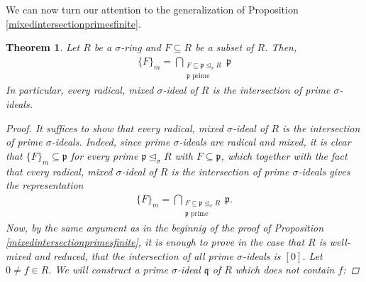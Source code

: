 \documentclass{article}
\def\p{\mathfrak{p}}
\def\q{\mathfrak{q}}
\def\s{\sigma}
\def\si{\unlhd_{\sigma}}
\newenvironment{bew}{\begin{proof}[Proof]}{\end{proof}}
\theoremstyle{plain}
\newtheorem{theorem}[Satz]{Theorem}
\theoremstyle{definition}
\begin{document}
We can now turn our attention to the generalization of Proposition \ref{mixedintersectionprimesfinite}. 


\begin{theorem}\label{intersectionprimes}
Let $R$ be a $\s$-ring and $F \subseteq R$ be a subset of $R$. Then, 
\begin{align*} \{F\}_m = \bigcap_{\substack{F \subseteq \p \si R \\ \p \text{ prime}}} \p \end{align*}
In particular, every radical, mixed $\s$-ideal of $R$ is the intersection of prime $\s$-ideals.
\begin{bew}
It suffices to show that every radical, mixed $\s$-ideal of $R$ is the intersection of prime $\s$-ideals.
Indeed, since prime $\s$-ideals are radical and mixed, it is clear that $\{F\}_m \subseteq \p$ for every prime $\p \si R$ with $F \subseteq \p$, which together with the fact that every radical, mixed $\s$-ideal of $R$ is the intersection of prime $\s$-ideals gives the representation 
\begin{align*} \{F\}_m = \bigcap_{\substack{F \subseteq \p \si R \\ \p \text{ prime}}} \p. \end{align*}
Now, by the same argument as in the beginnig of the proof of Proposition \ref{mixedintersectionprimesfinite}, it is enough to prove in the case that $R$ is well-mixed and reduced, that the intersection of all prime $\s$-ideals is $[0]$.
Let $0 \neq f \in R$. We will construct a prime $\s$-ideal $\q$ of $R$ which does not contain $f$: 


\end{bew}
\end{theorem}
\end{document}
